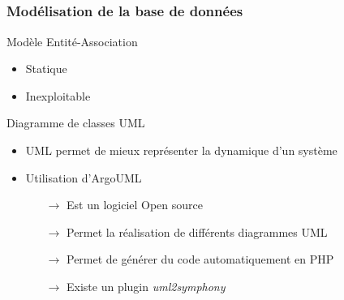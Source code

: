 \subsection{} 

\begin{frame}
\frametitle{Modélisation de la base de données}
		Modèle Entité-Association
		\begin{itemize}
			\item Statique
			\item Inexploitable \\
		\end{itemize}		 
		 Diagramme de classes UML
		\begin{itemize}
			\item UML permet de mieux représenter la dynamique d'un système
			\item Utilisation d'ArgoUML
			\begin{itemize}
				\item[$\rightarrow  $] Est un logiciel Open source
				\item[$\rightarrow  $] Permet la réalisation de différents diagrammes UML
				\item[$\rightarrow  $] Permet de générer du code automatiquement en PHP
				\item[$\rightarrow  $] Existe un plugin \textit{uml2symphony}
			\end{itemize}
		\end{itemize}
\end{frame}

